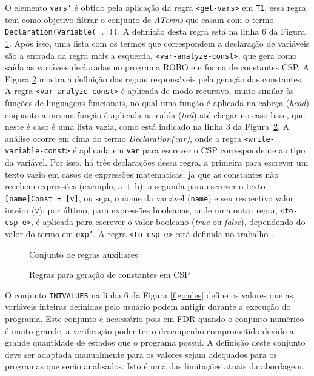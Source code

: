 O elemento \texttt{vars'} é obtido pela aplicação da regra \texttt{<get-vars>} em \texttt{T1}, essa regra tem como objetivo filtrar o conjunto de \textit{ATerms} que casam com o termo \texttt{Declaration(Variable(\_,\_))}. A definição desta regra está na linha 6 da Figura \ref{fig:rules2}. Após isso, uma lista com os termos que correspondem a declaração de variáveis são a entrada da regra mais a esquerda, \texttt{<var-analyze-const>}, que gera como saída  as variáveis declaradas no programa ROBO em forma de constantes CSP. A Figura \ref{fig:rules_constants} mostra a definição das regras responsáveis pela geração das constantes. A regra \texttt{<var-analyze-const>} é aplicada de modo recursivo, muito similar às funções de linguagens funcionais, no qual uma função é aplicada na cabeça (\textit{head}) enquanto a mesma função é aplicada na calda (\textit{tail}) até chegar no caso base, que neste é caso é uma lista vazia, como está indicado na linha 3 da Figura~\ref{fig:rules_constants}. A análise ocorre em cima do termo \textit{Declaration(var)}, onde a regra \texttt{<write-variable-const>} é aplicada em \texttt{var} para escrever o CSP correspondente ao tipo da variável. Por isso, há três declarações dessa regra, a primeira para escrever um texto vazio em casos de expressões matemáticas, já que as constantes não recebem expressões (exemplo, a + b); a segunda para escrever o texto \texttt{[name]Const = [v]}, ou seja, o nome da variável (\texttt{name}) e seu respectivo valor inteiro (\texttt{v}); por último, para expressões booleanas, onde uma outra regra, \texttt{<to-csp-e>}, é aplicada para escrever o valor booleano (\textit{true} ou \textit{false}), dependendo do valor do termo em \texttt{exp'}. A regra \texttt{<to-csp-e>} está definida no trabalho~\cite{nogueira}.

\begin{figure}[!h]
\centering
\caption{Conjunto de regras auxiliares}

\label{fig:rules2}
\end{figure}

\begin{figure}[!h]
\centering
\caption{Regras para geração de constantes em CSP}

\label{fig:rules_constants}
\end{figure}

O conjunto \texttt{INTVALUES} na linha 6 da Figura \ref{fig:rules} define os valores que as variáveis inteiras definidas pelo usuário podem antigir durante a execução do programa. Este conjunto é necessário pois em FDR quando o conjunto numérico é muito grande, a verificação poder ter o desempenho comprometido devido a grande quantidade de estados que o programa possui. A definição deste conjunto deve ser adaptada manualmente para os valores sejam adequados para os programas que serão analisados. Isto é uma das limitações atuais da abordagem.


